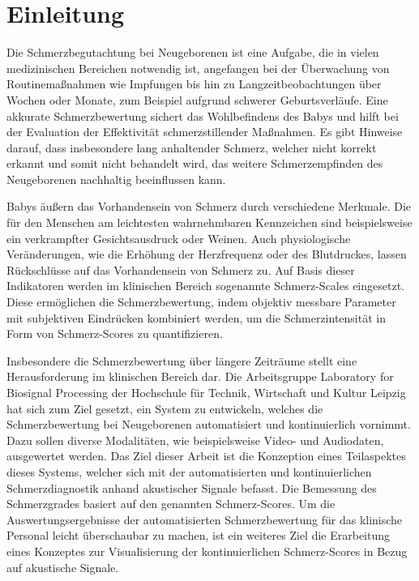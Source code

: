\chapter{Einleitung}

Die Schmerzbegutachtung bei Neugeborenen ist eine Aufgabe, die in vielen medizinischen Bereichen notwendig ist, angefangen bei der Überwachung von Routinemaßnahmen wie Impfungen bis hin zu Langzeitbeobachtungen über Wochen oder Monate, zum Beispiel aufgrund schwerer Geburtsverläufe. Eine akkurate Schmerzbewertung sichert das Wohlbefindens des Babys und hilft bei der Evaluation der Effektivität schmerzstillender Maßnahmen. Es gibt Hinweise darauf, dass insbesondere lang anhaltender Schmerz, welcher nicht korrekt erkannt und somit nicht behandelt wird, das weitere Schmerzempfinden des Neugeborenen nachhaltig beeinflussen kann.\cite[S. 402 - 403]{PainAssessment03} \cite[S. 439]{PainAssessment01}

Babys äußern das Vorhandensein von Schmerz durch verschiedene Merkmale. Die für den Menschen am leichtesten wahrnehmbaren Kennzeichen sind beispielsweise ein verkrampfter Gesichtsausdruck oder Weinen. Auch physiologische Veränderungen, wie die Erhöhung der Herzfrequenz oder des Blutdruckes, lassen Rückschlüsse auf das Vorhandensein von Schmerz zu.\cite[S. 440]{PainAssessment01} Auf Basis dieser Indikatoren werden im klinischen Bereich sogenannte Schmerz-Scales eingesetzt. Diese ermöglichen die Schmerzbewertung, indem objektiv messbare Parameter mit subjektiven Eindrücken kombiniert werden, um die Schmerzintensität in Form von Schmerz-Scores zu quantifizieren.\cite[S. 100 - 101]{painInNeonates}


Insbesondere die Schmerzbewertung über längere Zeiträume stellt eine Herausforderung im klinischen Bereich dar.\cite[S. 240]{painAssessmentStatus} Die Arbeitsgruppe \glqq Laboratory for Biosignal Processing\grqq{} der Hochschule für Technik, Wirtschaft und Kultur Leipzig hat sich zum Ziel gesetzt, ein System zu entwickeln, welches die Schmerzbewertung bei Neugeborenen automatisiert und kontinuierlich vornimmt. Dazu sollen diverse Modalitäten, wie beispielsweise Video- und Audiodaten, ausgewertet werden. Das Ziel dieser Arbeit ist die Konzeption eines Teilaspektes dieses Systems, welcher sich mit der automatisierten und kontinuierlichen Schmerzdiagnostik anhand akustischer Signale befasst. Die Bemessung des Schmerzgrades basiert auf den genannten Schmerz-Scores. Um die Auswertungsergebnisse der automatisierten Schmerzbewertung für das klinische Personal leicht überschaubar zu machen, ist ein weiteres Ziel die Erarbeitung eines Konzeptes zur Visualisierung der kontinuierlichen Schmerz-Scores in Bezug auf akustische Signale.


